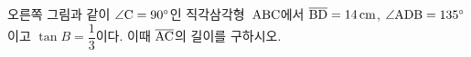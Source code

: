 \noindent\begin{minipage}[t]{0.58\linewidth}\vspace{0pt}\raggedright 오른쪽 그림과 같이 $\angle\mathrm{C}=90^\circ$인 직각삼각형~$\mathrm{ABC}$에서 $\overline{\mathrm{BD}}=14\,\mathrm{cm}$, $\angle\mathrm{ADB}=135^\circ$이고 $\tan B=\dfrac{1}{3}$이다. 이때 $\overline{\mathrm{AC}}$의 길이를 구하시오.\end{minipage}\hfill\begin{minipage}[t]{0.4\linewidth}\vspace{0pt}\centering \resizebox{\ifdim\width>\linewidth\linewidth\else\width\fi}{!}{}\end{minipage}\par
